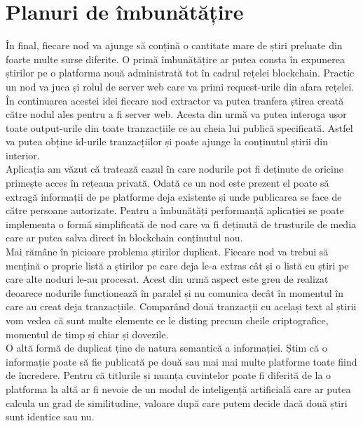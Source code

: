 \clearpage

\section{Planuri de îmbunătățire}

În final, fiecare nod va ajunge să conțină o cantitate mare de știri preluate din foarte multe surse diferite. O primă îmbunătățire ar putea consta în expunerea știrilor pe o platforma nouă administrată tot în cadrul rețelei blockchain. Practic un nod va juca și rolul de server web care va primi request-urile din afara rețelei.\\

În continuarea acestei idei fiecare nod extractor va putea tranfera știrea creată către nodul ales pentru a fi server web. Acesta din urmă va putea interoga ușor toate output-urile din toate tranzacțiile ce au cheia lui publică specificată. Astfel va putea obține id-urile tranzacțiilor și poate ajunge la conținutul știrii din interior.\\

Aplicația am văzut că tratează cazul în care nodurile pot fi deținute de oricine primește acces în rețeaua privată. Odată ce un nod este prezent el poate să extragă informații de pe platforme deja existente și unde publicarea se face de către persoane autorizate. Pentru a îmbunătăți performanță aplicației se poate implementa o formă simplificată de nod care va fi deținută de trusturile de media care ar putea salva direct în blockchain conținutul nou.\\

Mai rămâne în picioare problema știrilor duplicat. Fiecare nod va trebui să mențină o proprie listă a știrilor pe care deja le-a extras cât și o listă cu știri pe care alte noduri le-au procesat. Acest din urmă aspect este greu de realizat deoarece nodurile funcționează în paralel și nu comunica decât în momentul în care au creat deja tranzacțiile. Comparând două tranzacții cu același text al știrii vom vedea că sunt multe elemente ce le disting precum cheile criptografice, momentul de timp și chiar și dovezile.\\

O altă formă de duplicat ține de natura semantică a informației. Știm că o informație poate să fie publicată pe două sau mai mai multe platforme toate fiind de încredere. Pentru că titlurile și nuanța cuvintelor poate fi diferită de la o platforma la altă ar fi nevoie de un modul de inteligență artificială care ar putea calcula un grad de similitudine, valoare după care putem decide dacă două știri sunt identice sau nu.\\